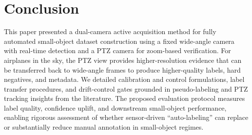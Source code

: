 \documentclass[conf]{new-aiaa}
\begin{document}
{\section{Conclusion}
This paper presented a dual-camera active acquisition method for fully automated small-object dataset construction using a fixed wide-angle camera with real-time detection and a PTZ camera for zoom-based verification. For airplanes in the sky, the PTZ view provides higher-resolution evidence that can be transferred back to wide-angle frames to produce higher-quality labels, hard negatives, and metadata. We detailed calibration and control formulations, label transfer procedures, and drift-control gates grounded in pseudo-labeling and PTZ tracking insights from the literature. The proposed evaluation protocol measures label quality, confidence uplift, and downstream small-object performance, enabling rigorous assessment of whether sensor-driven ``auto-labeling'' can replace or substantially reduce manual annotation in small-object regimes.
}
\end{document}
